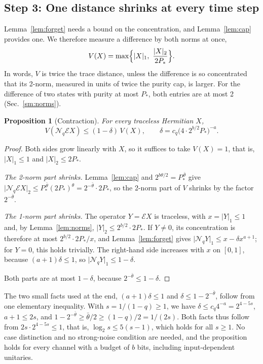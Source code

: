 \documentclass[aps,prl,twocolumn,superscriptaddress,floatfix]{revtex4-2}
\theoremstyle{plain}
\newtheorem{proposition}[lemma]{Proposition}
\newcommand{\nrm}[2]{\lvert #1\rvert_{#2}}
\newcommand{\cE}{\mathcal E}
\newcommand{\Nq}{\mathcal N_q}
\begin{document}
\subsection{Step 3: One distance shrinks at every time step}
\label{sm:contract}

Lemma~\ref{lem:forget} needs a bound on the concentration, and Lemma~\ref{lem:cap} provides one. We therefore measure a difference by both norms at once,
\begin{equation}
V(X)=\max\Bigl\{\nrm X1,\ \frac{\nrm X2}{2P_*}\Bigr\}.
\label{eq:S-V}
\end{equation}
In words, $V$ is twice the trace distance, unless the difference is so concentrated that its 2-norm, measured in units of twice the purity cap, is larger. For the difference of two states with purity at most $P_*$, both entries are at most 2 (Sec.~\ref{sm:norms}).

\begin{proposition}[Contraction]\label{prop:contraction}
For every traceless Hermitian $X$,
\begin{equation}
V(\Nq\cE X)\le(1-\delta)\,V(X),\qquad\delta=c_q\bigl(4\cdot2^{b/2}P_*\bigr)^{-a}.
\label{eq:S-contraction}
\end{equation}
\end{proposition}

\begin{proof}
Both sides grow linearly with $X$, so it suffices to take $V(X)=1$, that is, $\nrm X1\le1$ and $\nrm X2\le2P_*$.

\emph{The 2-norm part shrinks.} Lemma~\ref{lem:cap} and $2^{b\theta/2}=P_*^{\,\bar\theta}$ give $\nrm{\Nq\cE X}2\le P_*^{\,\bar\theta}(2P_*)^{\theta}=2^{-\bar\theta}\cdot2P_*$, so the 2-norm part of $V$ shrinks by the factor $2^{-\bar\theta}$.

\emph{The 1-norm part shrinks.} The operator $Y=\cE X$ is traceless, with $x=\nrm Y1\le1$ and, by Lemma~\ref{lem:norms}, $\nrm Y2\le2^{b/2}\cdot2P_*$. If $Y\ne0$, its concentration is therefore at most $2^{b/2}\cdot2P_*/x$, and Lemma~\ref{lem:forget} gives $\nrm{\Nq Y}1\le x-\delta x^{a+1}$; for $Y=0$, this holds trivially. The right-hand side increases with $x$ on $[0,1]$, because $(a+1)\delta\le1$, so $\nrm{\Nq Y}1\le1-\delta$.

Both parts are at most $1-\delta$, because $2^{-\bar\theta}\le1-\delta$.
\end{proof}

The two small facts used at the end, $(a+1)\delta\le1$ and $\delta\le1-2^{-\bar\theta}$, follow from one elementary inequality. With $s=1/(1-q)\ge1$, we have $\delta\le c_q4^{-a}=2^{4-5s}$, $a+1\le2s$, and $1-2^{-\bar\theta}\ge\bar\theta/2\ge(1-q)/2=1/(2s)$. Both facts thus follow from $2s\cdot2^{4-5s}\le1$, that is, $\log_2s\le5(s-1)$, which holds for all $s\ge1$. No case distinction and no strong-noise condition are needed, and the proposition holds for every channel with a budget of $b$ bits, including input-dependent unitaries.
\end{document}
